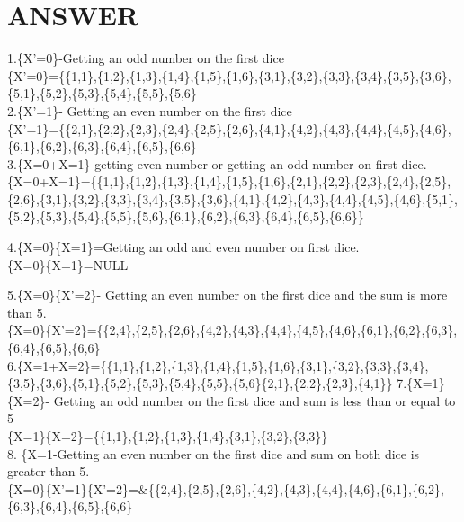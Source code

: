 \documentclass{beamer}
\begin{document}
\section{ANSWER}
\begin{frame}{}

1.\{X'=0\}-Getting an odd number on the first dice\\
\{X'=0\}=\{\{1,1\},\{1,2\},\{1,3\},\{1,4\},\{1,5\},\{1,6\},\{3,1\},\{3,2\},\{3,3\},\{3,4\},\{3,5\},\{3,6\},\{5,1\},\{5,2\},\{5,3\},\{5,4\},\{5,5\},\{5,6\}\\
2.\{X'=1\}- Getting an even number on the first dice\\

\{X'=1\}=\{\{2,1\},\{2,2\},\{2,3\},\{2,4\},\{2,5\},\{2,6\},\{4,1\},\{4,2\},\{4,3\},\{4,4\},\{4,5\},\{4,6\},\{6,1\},\{6,2\},\{6,3\},\{6,4\},\{6,5\},\{6,6\}\\
3.\{X=0+X=1\}-getting even number or getting an odd number on first dice.\\

\{X=0+X=1\}=\{\{1,1\},\{1,2\},\{1,3\},\{1,4\},\{1,5\},\{1,6\},\{2,1\},\{2,2\},\{2,3\},\{2,4\},\{2,5\},\{2,6\},\{3,1\},\{3,2\},\{3,3\},\{3,4\},\{3,5\},\{3,6\},\{4,1\},\{4,2\},\{4,3\},\{4,4\},\{4,5\},\{4,6\},\{5,1\},\{5,2\},\{5,3\},\{5,4\},\{5,5\},\{5,6\},\{6,1\},\{6,2\},\{6,3\},\{6,4\},\{6,5\},\{6,6\}\}

4.\{X=0\}\{X=1\}=Getting an odd and even number on first dice.\\
\{X=0\}\{X=1\}=NULL\\
\end{frame}
\begin{frame}
5.\{X=0\}\{X'=2\}- Getting an even number on the first dice and the sum is more than 5.\\
\{X=0\}\{X'=2\}=\{\{2,4\},\{2,5\},\{2,6\},\{4,2\},\{4,3\},\{4,4\},\{4,5\},\{4,6\},\{6,1\},\{6,2\},\{6,3\},\{6,4\},\{6,5\},\{6,6\}\\
6.\{X=1+X=2\}=\{\{1,1\},\{1,2\},\{1,3\},\{1,4\},\{1,5\},\{1,6\},\{3,1\},\{3,2\},\{3,3\},\{3,4\},\{3,5\},\{3,6\},\{5,1\},\{5,2\},\{5,3\},\{5,4\},\{5,5\},\{5,6\}\{2,1\},\{2,2\},\{2,3\},\{4,1\}\}
7.\{X=1\}\{X=2\}- Getting an odd number on the first dice and sum is less than or equal to 5\\
\{X=1\}\{X=2\}=\{\{1,1\},\{1,2\},\{1,3\},\{1,4\},\{3,1\},\{3,2\},\{3,3\}\}\\
8. \{X=1-Getting an even number on the first dice and sum on both dice is greater than 5.\\
\{X=0\}\{X'=1\}\{X'=2\}=&\{\{2,4\},\{2,5\},\{2,6\},\{4,2\},\{4,3\},\{4,4\},\{4,6\},\{6,1\},\{6,2\},\{6,3\},\{6,4\},\{6,5\},\{6,6\}\\
\end{frame}
\end{document}
